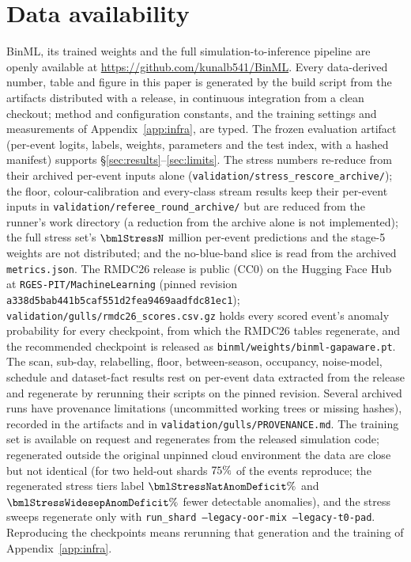 \documentclass[twocolumn,linenumbers,floatfix,twocolappendix]{aastex701}
\newcommand{\code}[1]{\texttt{#1}}
\begin{document}


\section*{Data availability}
\sloppy     %
BinML, its trained weights and the full simulation-to-inference pipeline are openly available at
\url{https://github.com/kunalb541/BinML}. Every data-derived number, table and figure in this paper is generated by
the build script from the artifacts distributed with a release, in continuous integration from a clean checkout;
method and configuration constants, and the training settings and measurements of Appendix~\ref{app:infra}, are
typed. The frozen evaluation artifact (per-event logits, labels, weights, parameters and the test index, with a
hashed manifest) supports \S\ref{sec:results}--\ref{sec:limits}. The stress numbers re-reduce from their archived
per-event inputs alone (\code{validation/stress\_rescore\_archive/}); the floor, colour-calibration and every-class
stream results keep their per-event inputs in \code{validation/referee\_round\_archive/} but are reduced from the
runner's work directory (a reduction from the archive alone is not implemented); the full stress set's
$\bmlStressN$ million per-event predictions and the stage-5 weights are not distributed; and the no-blue-band slice
is read from the archived \code{metrics.json}. The RMDC26 release \citep{RGESPIT2026} is public (CC0) on the Hugging
Face Hub at \code{RGES-PIT/MachineLearning} (pinned revision \code{a338d5bab441b5caf551d2fea9469aadfdc81ec1});
\code{validation/gulls/rmdc26\_scores.csv.gz} holds every scored event's anomaly probability for every checkpoint,
from which the RMDC26 tables regenerate, and the recommended checkpoint is released as
\code{binml/weights/binml-gapaware.pt}. The scan, sub-day, relabelling, floor, between-season, occupancy,
noise-model, schedule and dataset-fact results rest on per-event data extracted from the release and regenerate by rerunning
their scripts on the pinned revision. Several archived runs have provenance limitations (uncommitted working trees
or missing hashes), recorded in the artifacts and in \code{validation/gulls/PROVENANCE.md}. The training set is
available on request and regenerates from the released simulation code; regenerated outside the original unpinned
cloud environment the data are close but not identical (for two held-out shards $75\%$ of the events
reproduce; the regenerated stress tiers label $\bmlStressNatAnomDeficit\%$ and $\bmlStressWidesepAnomDeficit\%$
fewer detectable anomalies), and the stress sweeps regenerate only with
\code{run\_shard --legacy-oor-mix --legacy-t0-pad}. Reproducing the checkpoints means rerunning that generation and
the training of Appendix~\ref{app:infra}.
\end{document}
